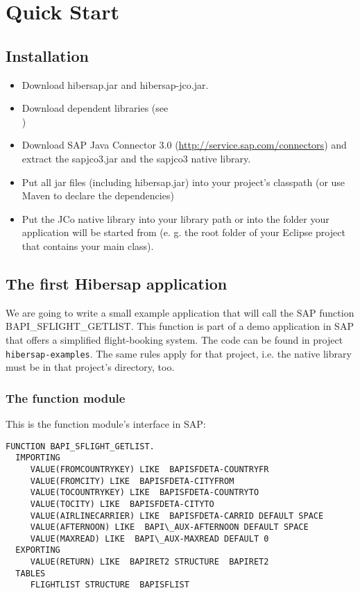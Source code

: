 \chapter{Quick Start}
\label{cha:QuickStart}

\section{Installation}

\begin{itemize}
  \item Download hibersap.jar and hibersap-jco.jar. 
  \item Download dependent libraries (see \\ \urlHibersapDependencies)
  \item Download SAP Java Connector 3.0 (\url{http://service.sap.com/connectors}) and extract the sapjco3.jar and the
  sapjco3 native library. 
  \item Put all jar files (including hibersap.jar) into your project's classpath (or use Maven to declare the
  dependencies)
  \item Put the JCo native library into your library path or into the folder your application will be started
    from (e. g. the root folder of your Eclipse project that contains your main class).
\end{itemize} 


\section{The first Hibersap application}

We are going to write a small example application that will call the SAP function BAPI\_\-SFLIGHT\_\-GETLIST.
This function is part of a demo application in SAP that offers a simplified flight-booking system.
The code can be found in project {\tt hibersap-examples}. The same rules apply for that project, i.e. the native
library must be in that project's directory, too.


\subsection{The function module}

This is the function module's interface in SAP:

\begin{Verbatim}[frame=single,label=The ABAP Function]
FUNCTION BAPI_SFLIGHT_GETLIST.
  IMPORTING
     VALUE(FROMCOUNTRYKEY) LIKE  BAPISFDETA-COUNTRYFR
     VALUE(FROMCITY) LIKE  BAPISFDETA-CITYFROM
     VALUE(TOCOUNTRYKEY) LIKE  BAPISFDETA-COUNTRYTO
     VALUE(TOCITY) LIKE  BAPISFDETA-CITYTO
     VALUE(AIRLINECARRIER) LIKE  BAPISFDETA-CARRID DEFAULT SPACE
     VALUE(AFTERNOON) LIKE  BAPI\_AUX-AFTERNOON DEFAULT SPACE
     VALUE(MAXREAD) LIKE  BAPI\_AUX-MAXREAD DEFAULT 0
  EXPORTING
     VALUE(RETURN) LIKE  BAPIRET2 STRUCTURE  BAPIRET2
  TABLES
     FLIGHTLIST STRUCTURE  BAPISFLIST
\end{Verbatim}

